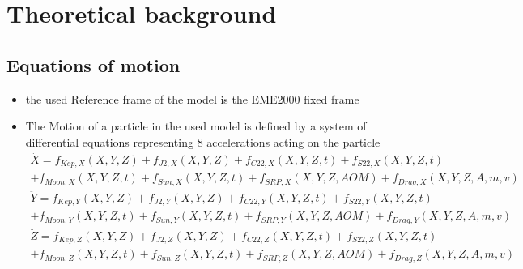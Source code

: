 \documentclass[11pt,
               a4paper,
               bibtotoc,
               idxtotoc,
               headsepline,
               footsepline,
               footexclude,
               BCOR12mm,
               DIV13,
               openany,   %
               ]
               {scrbook}
\begin{document}
\chapter{Theoretical background}
\section{Equations of motion}
    \begin{itemize}
        \item the used Reference frame of the model is the EME2000 fixed frame
        \item The Motion of a particle in the used model is defined by a system of differential equations representing 8 accelerations acting on the particle
        \begin{equation}
            \begin{array}{ll}
                 \ddot{X} = f_{Kep,X}(X,Y,Z)+f_{J2,X}(X,Y,Z)+f_{C22,X}(X,Y,Z,t)+f_{S22,X}(X,Y,Z,t)\\
                +f_{Moon,X}(X,Y,Z,t)+f_{Sun,X}(X,Y,Z,t)+f_{SRP,X}(X,Y,Z,AOM)+f_{Drag,X}(X,Y,Z,A,m,v) \\
                \ddot{Y} = f_{Kep,Y}(X,Y,Z)+f_{J2,Y}(X,Y,Z)+f_{C22,Y}(X,Y,Z,t)+f_{S22,Y}(X,Y,Z,t)\\
                +f_{Moon,Y}(X,Y,Z,t)+f_{Sun,Y}(X,Y,Z,t)+f_{SRP,Y}(X,Y,Z,AOM)+f_{Drag,Y}(X,Y,Z,A,m,v) \\
                \ddot{Z} = f_{Kep,Z}(X,Y,Z)+f_{J2,Z}(X,Y,Z)+f_{C22,Z}(X,Y,Z,t)+f_{S22,Z}(X,Y,Z,t)\\
                +f_{Moon,Z}(X,Y,Z,t)+f_{Sun,Z}(X,Y,Z,t)+f_{SRP,Z}(X,Y,Z,AOM)+f_{Drag,Z}(X,Y,Z,A,m,v)
            \end{array}
        \end{equation}


\end{itemize}
\end{document}
